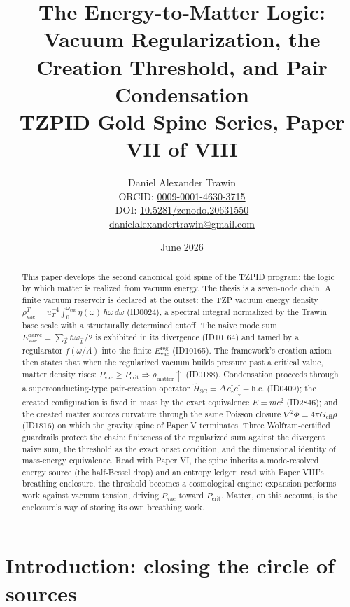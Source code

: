 \documentclass[11pt]{article}
\title{The Energy-to-Matter Logic: Vacuum Regularization, the Creation Threshold, and Pair Condensation\\[0.6em]
\large TZPID Gold Spine Series, Paper VII of VIII}
\author{Daniel Alexander Trawin\\
\small ORCID: \href{https://orcid.org/0009-0001-4630-3715}{0009-0001-4630-3715}\\
\small DOI: \href{https://doi.org/10.5281/zenodo.20631550}{10.5281/zenodo.20631550}\\
\small \href{mailto:danielalexandertrawin@gmail.com}{danielalexandertrawin@gmail.com}}
\date{June 2026}
\theoremstyle{remark}
\begin{document}
\maketitle

\begin{abstract}
This paper develops the second canonical gold spine of the TZPID program: the logic by which matter is realized from vacuum energy. The thesis is a seven-node chain. A finite vacuum reservoir is declared at the outset: the TZP vacuum energy density $\rho_{\mathrm{vac}}^T = u_T^{-4} \int_0^{\omega_{\mathrm{cut}}} \eta(\omega)\, \hbar\omega\, d\omega$ (ID0024), a spectral integral normalized by the Trawin base scale with a structurally determined cutoff. The naive mode sum $E^{\mathrm{naive}}_{\mathrm{vac}} = \sum_{\vec{k}} \hbar\omega_{\vec{k}}/2$ is exhibited in its divergence (ID10164) and tamed by a regularator $f(\omega/\Lambda)$ into the finite $E^{\mathrm{reg}}_{\mathrm{vac}}$ (ID10165). The framework's creation axiom then states that when the regularized vacuum builds pressure past a critical value, matter density rises: $P_{\mathrm{vac}} \geq P_{\mathrm{crit}} \Rightarrow \rho_{\mathrm{matter}} \uparrow$ (ID0188). Condensation proceeds through a superconducting-type pair-creation operator $\hat{H}_{\mathrm{SC}} = \Delta\, c^\dagger_\uparrow c^\dagger_\downarrow + \mathrm{h.c.}$ (ID0409); the created configuration is fixed in mass by the exact equivalence $E = mc^2$ (ID2846); and the created matter sources curvature through the same Poisson closure $\nabla^2\Phi = 4\pi G_{\mathrm{eff}}\rho$ (ID1816) on which the gravity spine of Paper V terminates. Three Wolfram-certified guardrails protect the chain: finiteness of the regularized sum against the divergent naive sum, the threshold as the exact onset condition, and the dimensional identity of mass-energy equivalence. Read with Paper VI, the spine inherits a mode-resolved energy source (the half-Bessel drop) and an entropy ledger; read with Paper VIII's breathing enclosure, the threshold becomes a cosmological engine: expansion performs work against vacuum tension, driving $P_{\mathrm{vac}}$ toward $P_{\mathrm{crit}}$. Matter, on this account, is the enclosure's way of storing its own breathing work.
\end{abstract}

\section{Introduction: closing the circle of sources}
\label{sec:intro}
\end{document}
